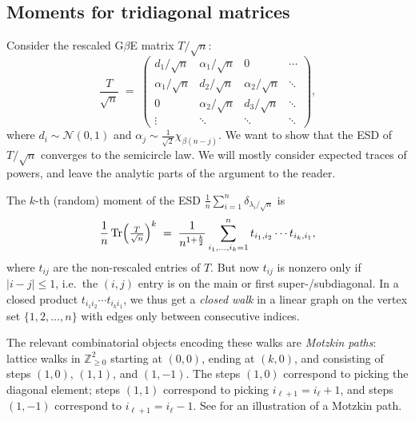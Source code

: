 \documentclass[letterpaper,11pt,oneside,reqno]{article}
\numberwithin{equation}{section}
\theoremstyle{definition}
\begin{document}
\subsection{Moments for tridiagonal matrices}
\label{sub:tridiag-moments}

Consider
the rescaled
G$\beta$E
matrix $T/\sqrt{n}$:
\[
  \frac{T}{\sqrt{n}}
  \;=\;
  \begin{pmatrix}
    d_1/\sqrt{n} & \alpha_1/\sqrt{n} & 0 & \cdots \\
    \alpha_1/\sqrt{n} & d_2/\sqrt{n} & \alpha_2/\sqrt{n} & \ddots \\
    0 & \alpha_2/\sqrt{n} & d_3/\sqrt{n} & \ddots \\
    \vdots & \ddots & \ddots & \ddots
  \end{pmatrix},
\]
where $d_i \sim \mathcal{N}(0,1)$ and $\alpha_j \sim \frac{1}{\sqrt 2}\chi_{\beta(n-j)}$.  We want to show that the ESD of $T/\sqrt{n}$ converges to the semicircle law.
We will mostly consider expected traces of powers, and leave the analytic parts of the
argument to the reader.

The $k$-th (random) moment of the ESD
$\frac{1}{n}\sum_{i=1}^n \delta_{\lambda_i/\sqrt{n}}$ is
\begin{equation}
	\label{eq:tridiagonal-moments-expansion}
  \frac{1}{n}\operatorname{Tr}\Bigl(\tfrac{T}{\sqrt{n}}\Bigr)^k
  \;=\;
  \frac{1}{n^{1 + \frac{k}{2}}}
  \sum_{i_1,\dots,i_k=1}^n
	t_{i_1,i_2}\cdots t_{i_k,i_1},
\end{equation}
where $t_{ij}$ are the non-rescaled entries of $T$.
But now $t_{ij}$ is nonzero only if $\lvert i-j\rvert \le1$,
i.e.\ the $(i,j)$ entry is on the main or first
super-/subdiagonal.
In a closed product $t_{i_1 i_2}\cdots t_{i_k i_1}$, we thus get a \emph{closed walk} in a linear graph on the vertex set $\{1,2,\dots,n\}$ with edges only between consecutive indices.

The relevant combinatorial objects encoding these walks are
\emph{Motzkin
paths}: lattice walks in $\mathbb{Z}^2_{\ge0}$
starting at $(0,0)$, ending at $(k,0)$, and consisting of steps
\((1,0)\), \((1,1)\), and \((1,-1)\).  The steps \((1,0)\) correspond to
picking the diagonal element; steps
\((1,1)\) correspond to picking $i_{\ell+1}=i_\ell+1$, and
steps \((1,-1)\) correspond to $i_{\ell+1}=i_\ell-1$.
See  for an illustration of a Motzkin path.
\end{document}

